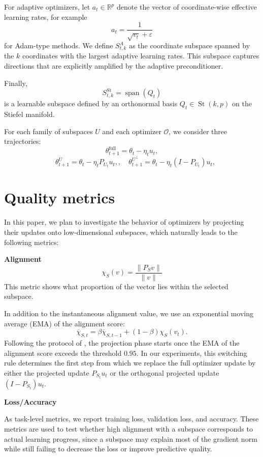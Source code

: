 \documentclass[conference]{IEEEtran}
\begin{document}
For adaptive optimizers, let $a_t \in \mathbb{R}^p$ denote the vector of coordinate-wise effective learning rates, for example
\[
a_t = \frac{1}{\sqrt{v_t} + \varepsilon}
\]
for Adam-type methods. We define $S_{t,k}^A$ as the coordinate subspace spanned by the $k$ coordinates with the largest adaptive learning rates. This subspace captures directions that are explicitly amplified by the adaptive preconditioner.

Finally,
\[
S_{t,k}^{\text{St}} = \operatorname{span}(Q_t)
\]
is a learnable subspace defined by an orthonormal basis $Q_t \in \operatorname{St}(k,p)$ on the Stiefel manifold.

For each family of subspaces $U$ and each optimizer $\mathcal{O}$, we consider three trajectories:
\[
\theta_{t+1}^{\text{full}} = \theta_t - \eta_t u_t, 
\]
\[
\quad \theta_{t+1}^{U} = \theta_t - \eta_t P_{U_t}u_t,, \quad \theta_{t+1}^{{U^\bot}} = \theta_t - \eta_t (I-P_{U_t})u_t,
\]


\section{Quality metrics}

In this paper, we plan to investigate the behavior of optimizers by projecting their updates onto low-dimensional subspaces, which naturally leads to the following metrics:

\textbf{Alignment}
\[
\chi_S(v) = \frac{\|P_S v\|}{\|v\|}
\]
This metric shows what proportion of the vector lies within the selected subspace.

In addition to the instantaneous alignment value, we use an exponential moving average (EMA) of the alignment score:
\[
\overline{\chi}_{S,t}
=
\beta \overline{\chi}_{S,t-1}
+
(1-\beta)\chi_S(v_t).
\]
Following the protocol of \citet{SongDoesSGD}, the projection phase starts once the EMA of the alignment score exceeds the threshold $0.95$. In our experiments, this switching rule determines the first step from which we replace the full optimizer update by either the projected update $P_{S_t}u_t$ or the orthogonal projected update $(I-P_{S_t})u_t$.

\textbf{Loss/Accuracy} 

As task-level metrics, we report training loss, validation loss, and accuracy. These metrics are used to test whether high alignment with a subspace corresponds to actual learning progress, since a subspace may explain most of the gradient norm while still failing to decrease the loss or improve predictive quality.
\end{document}
